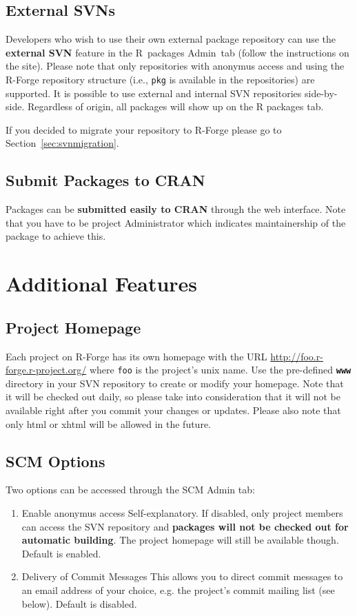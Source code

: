 \documentclass[a4paper]{article}
\begin{document}
\subsection{External SVNs}
Developers who wish to use their own external package repository can
use the \textbf{external SVN} feature in the R~packages Admin~tab
(follow the instructions on the site). Please note that only
repositories with anonymus access and using the R-Forge repository
structure (i.e., \texttt{pkg} is available in the repositories) are
supported. It is possible to use 
external and internal SVN repositories side-by-side. Regardless of
origin, all packages will show up on the R packages tab.

If you decided to migrate your repository to R-Forge please go to
Section~\ref{sec:svnmigration}.

\subsection{Submit Packages to CRAN}
Packages can be \textbf{submitted easily to CRAN} through the web interface.
Note that you have to be project Administrator which indicates maintainership
of the package to achieve this. 


\section{Additional Features}

\subsection{Project Homepage}
Each project on R-Forge has its own homepage with the URL
\url{http://foo.r-forge.r-project.org/} where \texttt{foo} is the
project's unix name. Use the
pre-defined \textbf{\texttt{www}} directory in your SVN repository to
create or modify your homepage. Note that it will be checked out
daily, so please take into consideration that it will not be available
right after you commit your changes or updates. Please also note that
only html or xhtml will be allowed in the future.


\subsection{SCM Options}
\label{sec:scmoptions}
Two options can be accessed through the SCM Admin tab:
\begin{enumerate}
\item{Enable anonymus access} Self-explanatory. If disabled, only
  project members can access the SVN repository and  \textbf{packages
    will not be checked out for automatic building}. The project
  homepage will still be available though. Default is enabled.

\item{Delivery of Commit Messages} This allows you to direct commit
  messages to an email address of your choice, e.g. the project's
  commit mailing list (see below). Default is disabled.
\end{enumerate}
\end{document}
